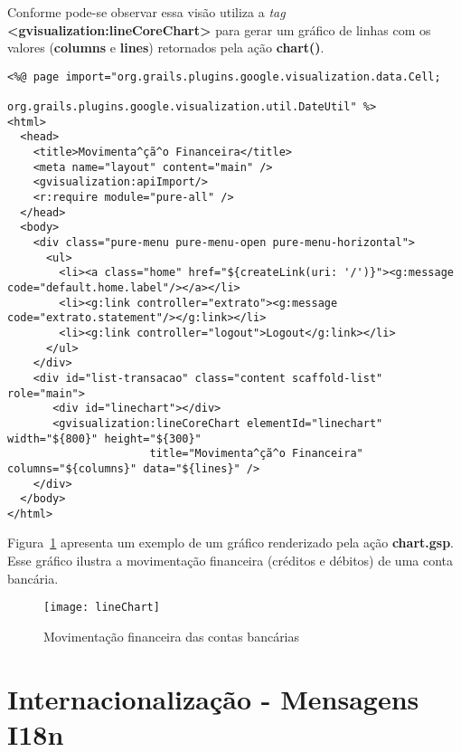 \noindent  Conforme  pode-se  observar  essa  visão utiliza  a  {\it  tag}  {\bf
  <gvisualization:lineCoreChart>} para gerar um gráfico de linhas com os valores
({\bf columns} e {\bf lines}) retornados pela ação {\bf chart()}.  

\vspace{0.4cm}

\begin{lstlisting}[caption=Visão {\bf extrato/chart.gsp}, frame=trBL,
    label=codChart]
<%@ page import="org.grails.plugins.google.visualization.data.Cell; 
                 org.grails.plugins.google.visualization.util.DateUtil" %>
<html>
  <head>
    <title>Movimenta^çã^o Financeira</title>
    <meta name="layout" content="main" />
    <gvisualization:apiImport/>
    <r:require module="pure-all" />
  </head>
  <body>
    <div class="pure-menu pure-menu-open pure-menu-horizontal">
      <ul>
        <li><a class="home" href="${createLink(uri: '/')}"><g:message code="default.home.label"/></a></li>
        <li><g:link controller="extrato"><g:message code="extrato.statement"/></g:link></li>
        <li><g:link controller="logout">Logout</g:link></li>
      </ul>
    </div>
    <div id="list-transacao" class="content scaffold-list" role="main">
       <div id="linechart"></div>
       <gvisualization:lineCoreChart elementId="linechart" width="${800}" height="${300}" 
                      title="Movimenta^çã^o Financeira" columns="${columns}" data="${lines}" />
    </div>
  </body>
</html>
\end{lstlisting}

\newpage

\noindent   Figura~\ref{figLineChart}  apresenta  um   exemplo  de   um  gráfico
renderizado  pela ação  {\bf chart.gsp}.   Esse gráfico  ilustra  a movimentação
financeira (créditos e débitos) de uma conta bancária.

\vspace{0.3cm}

\begin{figure}[h]
\centering\texttt{[image: lineChart]}
\caption{Movimentação financeira das contas bancárias}
\label{figLineChart}
\end{figure}

\section{Internacionalização - Mensagens I18n}

\vspace{0.5cm}

